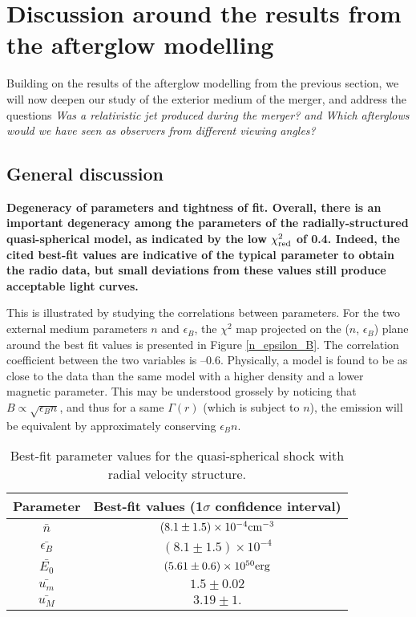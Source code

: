 \section{Discussion around the results from the afterglow modelling}

Building on the results of the afterglow modelling from the previous section, we will now deepen our study of the exterior medium of the merger, and address the questions \it{Was a relativistic jet produced during the merger?} and \it{Which afterglows would we have seen as observers from different viewing angles?}

\subsection{General discussion}

\bf{Degeneracy of parameters and tightness of fit. }Overall, there is an important degeneracy among the parameters of the radially-structured quasi-spherical model, as indicated by the low $\chi^2_{\rm{red}}$ of 0.4. Indeed, the cited best-fit values are indicative of the typical parameter to obtain the radio data, but small deviations from these values still produce acceptable light curves.

This is illustrated by studying the correlations between parameters. For the two external medium parameters $n$ and $\epsilon_B$, the $\chi^2$ map projected on the ($n$, $\epsilon_B$) plane around the best fit values is presented in Figure \ref{n_epsilon_B}. The correlation coefficient between the two variables is --0.6. Physically, a model is found to be as close to the data than the same model with a higher density and a lower magnetic parameter. This may be understood grossely by noticing that $B \propto \sqrt{\epsilon_B n}$, and thus for a same $\Gamma(r)$ (which is subject to $n$), the emission will be equivalent by approximately conserving $\epsilon_B n$.

\begin{table}
\begin{center}
\begin{tabular}{c|c}
\bf{Parameter} & \bf{Best-fit values (1$\sigma$ confidence interval)}\\
\hline
$\bar{n}$ & $(8.1\pm1.5) \times 10^{-4} \rm{cm}^{-3}$ \\
$\bar{\epsilon_B}$ & $(8.1\pm1.5) \times 10^{-4} $ \\
$\bar{E_0}$ & $(5.61\pm0.6) \times 10^{50} \rm{erg}$ \\
$\bar{u_m}$ & $1.5\pm0.02$ \\
$\bar{u_M}$ & $3.19\pm1.$ \\
\end{tabular}
\end{center}
\caption{Best-fit parameter values for the quasi-spherical shock with radial velocity structure.}
\label{cocoon}
\end{table}


